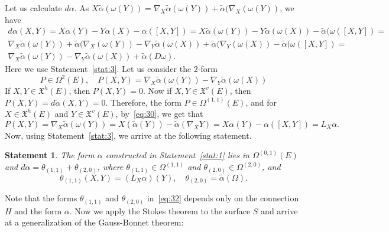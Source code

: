 \documentclass[12pt,letterpaper]{amsart}
\theoremstyle{definition}
\theoremstyle{plain}
\newtheorem{stat}{Statement}
\theoremstyle{remark}
\begin{document}
Let us calculate $d\alpha$.
As $X \widetilde{\alpha}(\omega(Y)) = \nabla_X \widetilde{\alpha}(\omega(Y)) + \widetilde{\alpha} (\nabla_X(\omega(Y))$, we have
\begin{multline}
d\alpha (X, Y) =X \alpha(Y) - Y \alpha(X) - \alpha( [X, Y] ) =
X \widetilde{\alpha}(\omega(Y)) - Y \widetilde{\alpha}(\omega(X)) - \widetilde{\alpha}(\omega([X, Y]) =
\\
\nabla_X \widetilde{\alpha}(\omega(Y)) + \widetilde{\alpha} (\nabla_X(\omega(Y))
- \nabla_Y \widetilde{\alpha}(\omega(X)) + \widetilde{\alpha} (\nabla_Y(\omega(X))
- \widetilde{\alpha}(\omega([X, Y]) =
\\
\nabla_X \widetilde{\alpha}(\omega(Y)) - \nabla_Y \widetilde{\alpha}(\omega(X)) +
\widetilde{\alpha}(D\omega).
\label{eq:29}
\end{multline}
Here we use Statement~\ref{stat:3}.
Let us consider the $2$-form
\begin{equation}
P \in \Omega^2(E), \quad P(X, Y) = \nabla_X \widetilde{\alpha}(\omega(Y)) - \nabla_Y \widetilde{\alpha}(\omega(X))
\label{eq:30}
\end{equation}
If $X, Y \in \mathfrak{X}^h(E)$, then $P(X, Y) = 0$.
Now if $X, Y \in \mathfrak{X}^v(E)$, then $P(X, Y) = d\widetilde{\alpha}(X, Y) = 0$.
Therefore, the form $P \in \Omega^{(1, 1)}(E)$, and for $X \in \mathfrak{X}^h(E)$ and $Y \in \mathfrak{X}^v(E)$, by~\eqref{eq:30}, we get that
\begin{equation}
P(X, Y) =\nabla_X \widetilde{\alpha} (\omega(Y)) =
X (\widetilde{\alpha}(Y)) - \widetilde{\alpha}(\nabla_X Y ) = X \alpha(Y) - \alpha( [X, Y] ) = L_X \alpha.
\label{eq:31}
\end{equation}
Now, using Statement~\ref{stat:3}, we arrive at the following statement.
\begin{stat}
The form $\alpha$ constructed in Statement~\ref{stat:1} lies in $\Omega^{(0, 1)}(E)$ and
$d \alpha = \theta_{(1, 1)} + \theta_{(2, 0)}$, where $\theta_{(1, 1)} \in \Omega^{(1, 1)}$ and $\theta_{(2, 0)} \in \Omega^{(2, 0)}$, and
\begin{equation}
\theta_{(1, 1)}(X, Y) = (L_X \alpha)(Y), \quad \theta_{(2, 0)} = \widetilde{\alpha}(\Omega).
\label{eq:32}
\end{equation}
\label{stat:5}
\end{stat}
Note that the forms $\theta_{(1, 1)}$ and $\theta_{(2, 0)}$ in~\eqref{eq:32} depends only on the connection $H$ and the form $\alpha$.
Now we apply the Stokes theorem to the surface $S$ and arrive at a generalization of the Gauss-Bonnet theorem:
\end{document}
